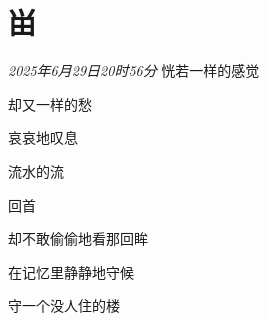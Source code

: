 \section*{畄}
\begin{center}
\textit{2025年6月29日20时56分}\hh 
恍若一样的感觉

却又一样的愁

哀哀地叹息

流水的流

回首

却不敢偷偷地看那回眸

在记忆里静静地守候

守一个没人住的楼
\end{center}